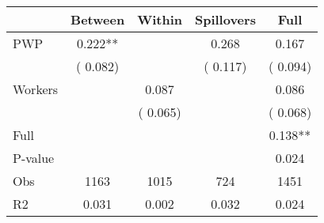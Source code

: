 
\begin{tabular}{l*{4}{c}}\hline&\multicolumn{1}{c}{Between}&\multicolumn{1}{c}{Within}&\multicolumn{1}{c}{Spillovers}&\multicolumn{1}{c}{Full}\\ \hline
 PWP           &              0.222**      &                                               &        0.268 &         0.167                            \\ 
                               &        (       0.082)           &                                       &       (       0.117)     &      (       0.094)                                           \\ 
 Workers       &                                               &        0.087    &                                &             0.086                            \\ 
                               &                                               & (       0.065)                  &                                        &      (       0.068)                                           \\ 
\hline                                                                                                                                                                                                                                            
 Full                  &                                               &                                               &                                        &             0.138**                                     \\ 
 P-value               &                                               &                                               &                                        &             0.024                                           \\ 
 Obs                   &               1163               &       1015                       &       724                &              1451                                               \\ 
 R2                    &                      0.031              &              0.002                      &              0.032               &                     0.024                                              \\ 
\hline \end{tabular}                                                                                                                                                                                                              